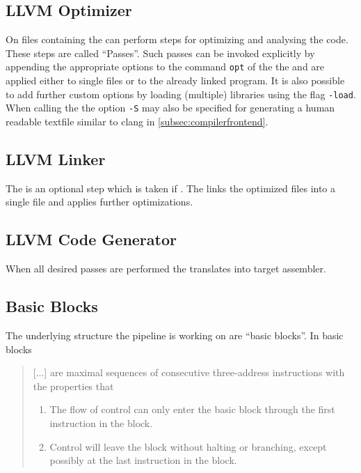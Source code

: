 \subsection{LLVM Optimizer}\label{subsec:optimizer}
On files containing \llvmir the \opt can perform steps for optimizing and analysing the code.
These steps are called \enquote{Passes}.
Such passes can be invoked explicitly by appending the appropriate options to the command \texttt{opt} of the the \opt and are applied either to single files or to the already linked program.
It is also possible to add further custom options by loading (multiple) libraries using the flag \texttt{-load}.
When calling the \opt the option \texttt{-S} may also be specified for generating a human readable textfile similar to clang in \autoref{subsec:compilerfrontend}.
\subsection{LLVM Linker}
The \linker is an optional step which is taken if .
The \linker links the optimized \llvmir files into a single \llvmir file and applies further optimizations.
\subsection{LLVM Code Generator}
When all desired passes are performed the \generator translates \llvmir into target assembler.
\subsection{Basic Blocks}
The underlying structure the pipeline is working on are \enquote{basic blocks}.
In \cite[chapter 8.4, p.~525]{Drachenbuch} basic blocks

\begin{quote}
    [...] are maximal sequences of consecutive three-address instructions with the properties that
    \begin{enumerate}[label=(\alph*)]
        \item The flow of control can only enter the basic block through the first instruction in the block.
        \item Control will leave the block without halting or branching, except possibly at the last instruction in the block.
    \end{enumerate}
\end{quote}

